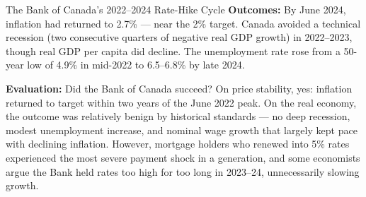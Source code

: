 \begin{casestudy}{The Bank of Canada's 2022--2024 Rate-Hike Cycle}
\textbf{Outcomes:} By June 2024, inflation had returned to 2.7\% --- near
the 2\% target. Canada avoided a technical recession (two consecutive
quarters of negative real GDP growth) in 2022--2023, though real GDP per
capita did decline. The unemployment rate rose from a 50-year low of 4.9\%
in mid-2022 to 6.5--6.8\% by late 2024.

\textbf{Evaluation:} Did the Bank of Canada succeed? On price stability,
yes: inflation returned to target within two years of the June 2022 peak.
On the real economy, the outcome was relatively benign by historical
standards --- no deep recession, modest unemployment increase, and nominal
wage growth that largely kept pace with declining inflation. However,
mortgage holders who renewed into 5\% rates experienced the most severe
payment shock in a generation, and some economists argue the Bank held
rates too high for too long in 2023--24, unnecessarily slowing growth.
\end{casestudy}

